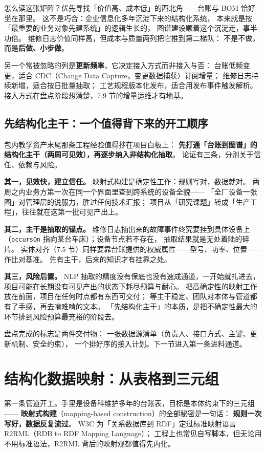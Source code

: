 怎么读这张矩阵？优先寻找「价值高、成本低」的西北角——台账与 BOM 恰好坐在那里。
这不是巧合：企业信息化多年沉淀下来的结构化系统，
本来就是按「最重要的业务对象先建系统」的逻辑生长的，
图谱建设顺着这个沉淀走，事半功倍。
维修日志价值同样高，但成本与质量两列把它推到第二梯队：
不是不做，而是\textbf{后做、小步做}。

另一个常被忽略的列是\textbf{更新频率}，它决定接入方式而非接入与否：
台账低频变更，适合 CDC（Change Data Capture，变更数据捕获）订阅增量；
维修日志持续新增，适合按日批量抽取；
工艺规程版本化发布，适合用发布事件触发解析。
接入方式在盘点阶段想清楚，7.9 节的增量运维才有地基。

\subsection{先结构化主干：一个值得背下来的开工顺序}

包内教学资产末尾那条工程经验值得抄在项目白板上：
\textbf{先打通「台账到图谱」的结构化主干（两周可见效），再逐步纳入非结构化抽取}。
论证有三条，分别关于信任、依赖与风险。

\textbf{其一，见效快，建立信任。}
映射式构建是确定性工作：规则写对，数据就对。
两周之内业务方第一次在同一个界面里查到跨系统的设备全貌——
「全厂设备一张图」对管理层的说服力，胜过任何技术汇报；
项目从「研究课题」转成「生产工程」，往往就在这第一批可见产出上。

\textbf{其二，主干是抽取的锚点。}
维修日志抽出来的故障事件终究要挂到具体设备上
（\texttt{occursOn} 指向某台车床）；设备节点若不存在，
抽取结果就是无处着陆的碎片。
实体对齐（7.5 节）同样要靠台账提供的权威属性——型号、功率、位置——作比对基准。
先有主干，后来的知识才有挂靠之处。

\textbf{其三，风险后置。}
NLP 抽取的精度没有保底也没有速成通道，一开始就扎进去，
项目可能在长期没有可见产出的状态下耗尽预算与耐心。
把高确定性的映射工作放在前面，项目在任何时点都有东西可交付；
等主干稳定、团队对本体与管道都有了手感，再去啃难啃的文本。
「先结构化主干」的本质，是把不确定性最大的环节排到风险预算最充裕的阶段去。

盘点完成的标志是两件交付物：
一张数据源清单（负责人、接口方式、主键、更新机制、安全约束），
一个排好序的接入计划。下一节进入第一条进料通道。

\section{结构化数据映射：从表格到三元组}

第一条管道开工。手里是设备科维护多年的台账表，目标是本体约束下的三元组——
\textbf{映射式构建}（mapping-based construction）的全部秘密是一句话：
\textbf{规则一次写好，数据反复流过}。
W3C 为「关系数据库到 RDF」定过标准映射语言 R2RML（RDB to RDF Mapping Language）；
工程上也常见自写脚本，但无论用不用标准语法，R2RML 背后的映射观都值得先内化。

